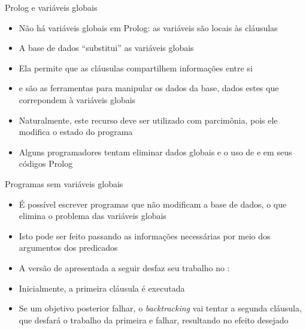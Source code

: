 \begin{frame}[fragile]{Prolog e variáveis globais}

    \begin{itemize}
        \item Não há variáveis globais em Prolog: as variáveis são locais às cláusulas

        \item A base de dados ``substitui'' as variáveis globais

        \item Ela permite que as cláusulas compartilhem informações entre si

        \item {} e  são as ferramentas para 
            manipular os dados da base, dados estes que correpondem à variáveis globais

        \item Naturalmente, este recurso deve ser utilizado com parcimônia, pois 
            ele modifica o estado do programa

        \item Alguns programadores tentam eliminar dados globais e o uso de 
             e  em seus códigos Prolog
 
    \end{itemize}

\end{frame}

\begin{frame}[fragile]{Programas sem variáveis globais}

    \begin{itemize}

        \item É possível escrever programas que não modificam a base de dados, o que elimina o 
            problema das variáveis globais

        \item Isto pode ser feito passando as informações necessárias por meio dos argumentos 
            dos predicados

        \item A versão de  apresentada a seguir desfaz seu trabalho no 
            :


        \item Inicialmente, a primeira cláusula é executada

        \item Se um objetivo posterior falhar, o \textit{backtracking} vai tentar a segunda 
            cláusula, que desfará o trabalho da primeira e falhar, resultando no efeito 
            desejado

    \end{itemize}

\end{frame}
